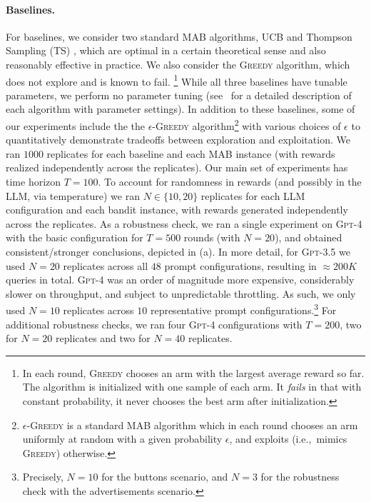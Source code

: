 \documentclass[11pt]{article}
\newcommand{\gptfour}{\textsc{Gpt-4}\xspace}
\newcommand{\gptthree}{\textsc{Gpt-3.5}\xspace}
\newcommand{\ucb}{\textsc{UCB}\xspace}
\newcommand{\ts}{\textsc{TS}\xspace}
\newcommand{\greedy}{\textsc{Greedy}\xspace}
\newcommand{\EpsGreedy}{$\epsilon$-\textsc{Greedy}\xspace}
\newcommand{\eps}{\epsilon}
\newcommand{\xhdr}[1]{\vspace{2mm} \noindent{\bf #1}}
\newcommand{\ie}{{i.e.,~\xspace}}
\let\oldparagraph\paragraph
\renewcommand{\paragraph}[1]{\oldparagraph{#1.}}
\begin{document}
\paragraph{Baselines}
For baselines, we consider two standard MAB algorithms, \ucb \citep{bandits-ucb1} and Thompson Sampling (\ts) \citep{Thompson-1933}, which are optimal in a certain theoretical sense and also reasonably effective in practice. We also consider the \greedy algorithm, which does not explore and is known to fail.
\footnote{\label{fn:greedy}In each round, \greedy chooses an arm with the largest average reward so far. The algorithm is initialized with one sample of each arm. It \emph{fails} in that with constant probability, it never chooses the best arm after initialization.}
While all three baselines have tunable parameters,
we perform no parameter tuning (see~ for a detailed description of each algorithm with parameter settings). In addition to these baselines, some of our experiments include the the \EpsGreedy algorithm\footnote{\label{fn:eps-greedy}\EpsGreedy is a standard MAB algorithm which in each round chooses an arm uniformly at random with a given probability $\eps$, and exploits (\ie mimics \greedy) otherwise.} with various choices of $\eps$ to quantitatively demonstrate tradeoffs between exploration and exploitation.
We ran $1000$ replicates for each baseline and each MAB instance (with rewards realized independently across the replicates).
\xhdr{Scale of the experiments.}
Our main set of experiments has time horizon $T=100$.
To account for randomness in rewards (and possibly in the LLM, via temperature) we ran $N \in \{10, 20\}$ replicates for each LLM configuration and each bandit instance, with rewards generated independently across the replicates.
As a robustness check, we ran a single experiment on \gptfour with the basic configuration for $T=500$ rounds (with $N=20$), and obtained consistent/stronger conclusions, depicted in (a).
In more detail, for \gptthree we used $N=20$ replicates across all $48$ prompt configurations, resulting in $\approx 200K$ queries in total.
\gptfour was an order of magnitude more expensive, considerably slower on throughput, and subject to unpredictable throttling.
As such, we only used $N=10$ replicates across $10$ representative prompt configurations.\footnote{Precisely, $N=10$ for the buttons scenario, and $N=3$ for the robustness check with the advertisements scenario.}
For additional robustness checks, we ran four \gptfour configurations with $T=200$, two for $N=20$ replicates and two for $N=40$ replicates.
\end{document}
